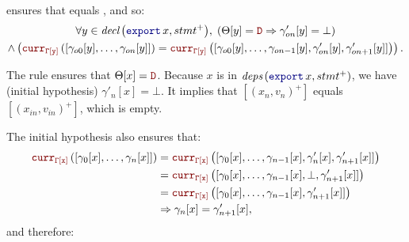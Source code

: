 \begin{skippableproof}
\begin{itemize}
               ensures that
               equals , and so:
              \begin{multline*}
                  \forall y \in \declSet{\export{x}, stmt^+}, \; \left(\Theta[y] = \dType \Rightarrow \gamma'_{on}[y] = \bot\right) \\
                  \wedge \left(\CurrVal{\tyCtx[y]}{[\gamma_{o0}[y], \dots, \gamma_{on}[y]]} = \CurrVal{\tyCtx[y]}{[\gamma_{o0}[y], \dots, \gamma_{on-1}[y], \gamma'_{on}[y], \gamma'_{on+1}[y]]}\right).
              \end{multline*}

              The rule  ensures that
              $\Theta[x] = \dType$. Because $x$ is in $\depSet{\export{x}, stmt^+}$, we have
              (initial hypothesis) $\gamma'_n[x] = \bot$. It implies that $[(x_n, v_n)^+]$ equals
              $[(x_{in}, v_{in})^+]$, which is empty.

              The initial hypothesis also ensures that:
              \begin{align*}
                  \CurrVal{\tyCtx[x]}{[\gamma_0[x], \dots, \gamma_n[x]]} & = \CurrVal{\tyCtx[x]}{[\gamma_0[x], \dots, \gamma_{n-1}[x], \gamma'_n[x], \gamma'_{n+1}[x]]} \\
                                                                         & = \CurrVal{\tyCtx[x]}{[\gamma_0[x], \dots, \gamma_{n-1}[x], \bot, \gamma'_{n+1}[x]]}         \\
                                                                         & = \CurrVal{\tyCtx[x]}{[\gamma_0[x], \dots, \gamma_{n-1}[x], \gamma'_{n+1}[x]]}               \\
                                                                         & \Rightarrow \gamma_n[x] = \gamma'_{n+1}[x],
              \end{align*}
              and therefore:


\end{itemize}
\end{skippableproof}
